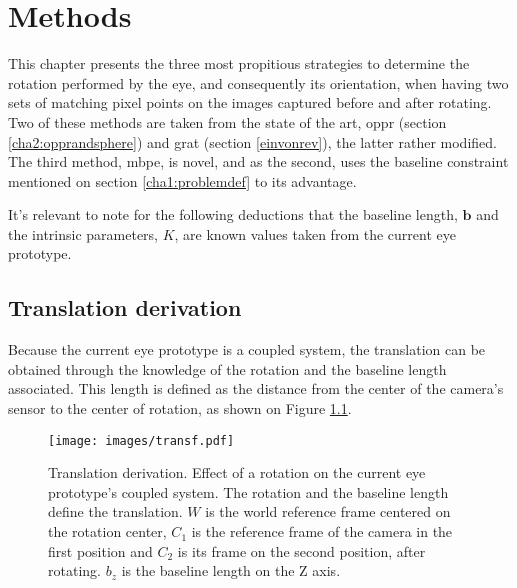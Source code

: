 
\chapter{Methods}
\label{methods}

This chapter presents the three most propitious strategies to determine the rotation performed by the eye, and consequently its orientation, when having two sets of matching pixel points on the images captured before and after rotating. Two of these methods are taken from the state of the art, \acrlong{oppr} (section \ref{cha2:opprandsphere}) and \acrlong{grat} (section \ref{einvonrev}), the latter rather modified. The third method, \acrfull{mbpe}, is novel, and as the second, uses the baseline constraint mentioned on section \ref{cha1:problemdef} to its advantage.

It's relevant to note for the following deductions that the baseline length, $\mathbf{b}$ and the intrinsic parameters, $K$, are known values taken from the current eye prototype.

\section{Translation derivation}

Because the current eye prototype is a coupled system, the translation can be obtained through the knowledge of the rotation and the baseline length associated. This length is defined as the distance from the center of the camera's sensor to the center of rotation, as shown on Figure \ref{cha3:detori:translation}.
\begin{figure}[ht]
	\centering
	\texttt{[image: images/transf.pdf]}
	\caption[Translation derivation]{Translation derivation. Effect of a rotation on the current eye prototype's coupled system. The rotation and the baseline length define the translation. ${W}$ is the world reference frame centered on the rotation center, ${C_1}$ is the reference frame of the camera in the first position and ${C_2}$ is its frame on the second position, after rotating. $b_z$ is the baseline length on the Z axis.}
	\label{cha3:detori:translation}
\end{figure}

